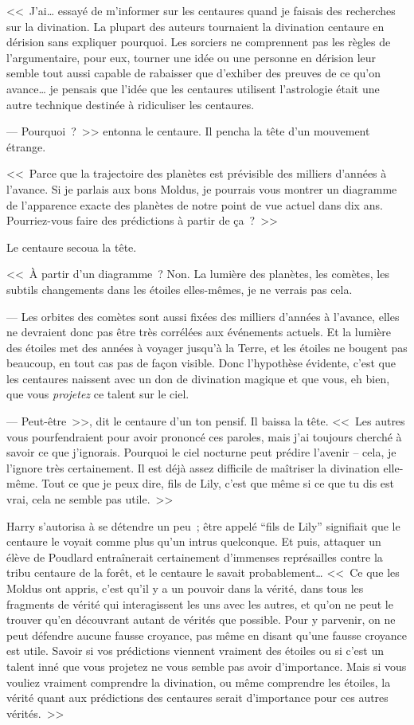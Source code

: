 <<~J'ai… essayé de m'informer sur les centaures quand je faisais des recherches sur la divination. La plupart des auteurs tournaient la divination centaure en dérision sans expliquer pourquoi. Les sorciers ne comprennent pas les règles de l'argumentaire, pour eux, tourner une idée ou une personne en dérision leur semble tout aussi capable de rabaisser que d'exhiber des preuves de ce qu'on avance… je pensais que l'idée que les centaures utilisent l'astrologie était une autre technique destinée à ridiculiser les centaures.

--- Pourquoi~?~>> entonna le centaure. Il pencha la tête d'un mouvement étrange.

<<~Parce que la trajectoire des planètes est prévisible des milliers d'années à l'avance. Si je parlais aux bons Moldus, je pourrais vous montrer un diagramme de l'apparence exacte des planètes de notre point de vue actuel dans dix ans. Pourriez-vous faire des prédictions à partir de ça~?~>>

Le centaure secoua la tête.

<<~À partir d'un diagramme~? Non. La lumière des planètes, les comètes, les subtils changements dans les étoiles elles-mêmes, je ne verrais pas cela.

--- Les orbites des comètes sont aussi fixées des milliers d'années à l'avance, elles ne devraient donc pas être très corrélées aux événements actuels. Et la lumière des étoiles met des années à voyager jusqu'à la Terre, et les étoiles ne bougent pas beaucoup, en tout cas pas de façon visible. Donc l'hypothèse évidente, c'est que les centaures naissent avec un don de divination magique et que vous, eh bien, que vous \emph{projetez} ce talent sur le ciel.

--- Peut-être~>>, dit le centaure d'un ton pensif. Il baissa la tête. <<~Les autres vous pourfendraient pour avoir prononcé ces paroles, mais j'ai toujours cherché à savoir ce que j'ignorais. Pourquoi le ciel nocturne peut prédire l'avenir -- cela, je l'ignore très certainement. Il est déjà assez difficile de maîtriser la divination elle-même. Tout ce que je peux dire, fils de Lily, c'est que même si ce que tu dis est vrai, cela ne semble pas utile.~>>

Harry s'autorisa à se détendre un peu~; être appelé “fils de Lily” signifiait que le centaure le voyait comme plus qu'un intrus quelconque. Et puis, attaquer un élève de Poudlard entraînerait certainement d'immenses représailles contre la tribu centaure de la forêt, et le centaure le savait probablement… <<~Ce que les Moldus ont appris, c'est qu'il y a un pouvoir dans la vérité, dans tous les fragments de vérité qui interagissent les uns avec les autres, et qu'on ne peut le trouver qu'en découvrant autant de vérités que possible. Pour y parvenir, on ne peut défendre aucune fausse croyance, pas même en disant qu'une fausse croyance est utile. Savoir si vos prédictions viennent vraiment des étoiles ou si c'est un talent inné que vous projetez ne vous semble pas avoir d'importance. Mais si vous vouliez vraiment comprendre la divination, ou même comprendre les étoiles, la vérité quant aux prédictions des centaures serait d'importance pour ces autres vérités.~>>

